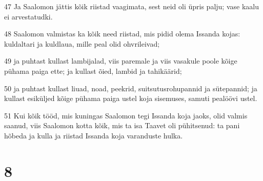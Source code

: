 \par 47 Ja Saalomon jättis kõik riistad vaagimata, sest neid oli üpris palju; vase kaalu ei arvestatudki.
\par 48 Saalomon valmistas ka kõik need riistad, mis pidid olema Issanda kojas: kuldaltari ja kuldlaua, mille peal olid ohvrileivad;
\par 49 ja puhtast kullast lambijalad, viis paremale ja viis vasakule poole kõige pühama paiga ette; ja kullast õied, lambid ja tahikäärid;
\par 50 ja puhtast kullast liuad, noad, peekrid, suitsutusrohupannid ja sütepannid; ja kullast esiküljed kõige pühama paiga ustel koja sisemuses, samuti pealöövi ustel.
\par 51 Kui kõik tööd, mis kuningas Saalomon tegi Issanda koja jaoks, olid valmis saanud, viis Saalomon kotta kõik, mis ta isa Taavet oli pühitsenud: ta pani hõbeda ja kulla ja riistad Issanda koja varanduste hulka.

\chapter{8}

